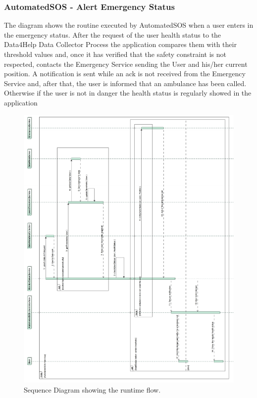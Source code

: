 \documentclass[a4paper]{article}
\begin{document}
\subsubsection{AutomatedSOS - Alert Emergency Status}
The diagram shows the routine executed by AutomatedSOS when a user enters in the emergency status. After the request of the user health status to the Data4Help Data Collector Process the application compares them with their threshold values and, once it has verified that the safety constraint is not respected, contacts the Emergency Service sending the User and his/her current position. A notification is sent while an ack is not received from the Emergency Service and, after that, the user is informed that an ambulance has been called. Otherwise if the user is not in danger the health status is regularly showed in the application

\begin{figure}[H]
    \centering
    \includegraphics[width=\linewidth]{SequenceDiagram-AlertEmergencyStatus}
    \caption{Sequence Diagram showing the runtime flow.}
    \label{fig:my_label}
\end{figure}
\clearpage
\end{document}

